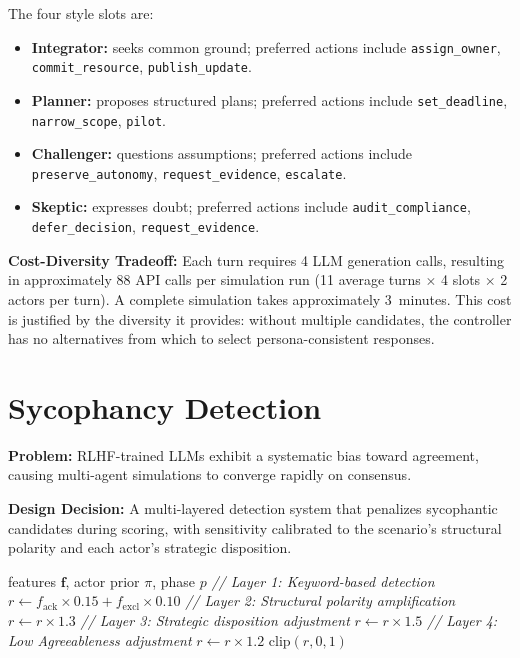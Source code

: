 The four style slots are:
\begin{itemize}[leftmargin=*, itemsep=1pt]
    \item \textbf{Integrator:} seeks common ground; preferred actions include \texttt{assign\_owner}, \texttt{commit\_resource}, \texttt{publish\_update}.
    \item \textbf{Planner:} proposes structured plans; preferred actions include \texttt{set\_deadline}, \texttt{narrow\_scope}, \texttt{pilot}.
    \item \textbf{Challenger:} questions assumptions; preferred actions include \texttt{preserve\_autonomy}, \texttt{request\_evidence}, \texttt{escalate}.
    \item \textbf{Skeptic:} expresses doubt; preferred actions include \texttt{audit\_compliance}, \texttt{defer\_decision}, \texttt{request\_evidence}.
\end{itemize}

\textbf{Cost-Diversity Tradeoff:} Each turn requires 4 LLM generation calls, resulting in approximately 88 API calls per simulation run (11 average turns $\times$ 4 slots $\times$ 2 actors per turn). A complete simulation takes approximately 3~minutes. This cost is justified by the diversity it provides: without multiple candidates, the controller has no alternatives from which to select persona-consistent responses.


\section{Sycophancy Detection}

\textbf{Problem:} RLHF-trained LLMs exhibit a systematic bias toward agreement, causing multi-agent simulations to converge rapidly on consensus.

\textbf{Design Decision:} A multi-layered detection system that penalizes sycophantic candidates during scoring, with sensitivity calibrated to the scenario's structural polarity and each actor's strategic disposition.

\begin{algorithm}[t]
\caption{Sycophancy Risk Detection}
\label{alg:sycophancy}
\begin{algorithmic}[1]
\Require features $\mathbf{f}$, actor prior $\pi$, phase $p$
\State \textit{// Layer 1: Keyword-based detection}
\State $r \gets f_{\text{ack}} \times 0.15 + f_{\text{excl}} \times 0.10$
\State \textit{// Layer 2: Structural polarity amplification}
    \State $r \gets r \times 1.3$ 
\EndIf
\State \textit{// Layer 3: Strategic disposition adjustment}
    \State $r \gets r \times 1.5$
\EndIf
\State \textit{// Layer 4: Low Agreeableness adjustment}
    \State $r \gets r \times 1.2$
\EndIf
\State \Return $\text{clip}(r, 0, 1)$
\end{algorithmic}
\end{algorithm}


